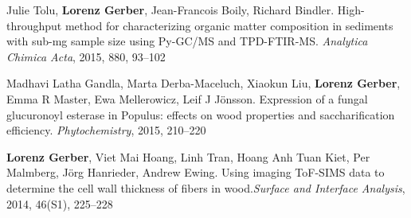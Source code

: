 \documentclass[10pt]{article}
\begin{document}
\begin{bibenum}
                                                                                           \item Julie Tolu, \textbf{Lorenz Gerber}, Jean-Francois Boily,
                                                                                             Richard Bindler. High-throughput method for characterizing
                                                                                             organic matter composition in sediments with sub-mg sample
                                                                                             size using Py-GC/MS and TPD-FTIR-MS. \textit{Analytica Chimica
                                                                                               Acta}, 2015, 880, 93--102\\


                                                                                           \item Madhavi Latha Gandla, Marta Derba-Maceluch, Xiaokun
                                                                                             Liu, \textbf{Lorenz Gerber}, Emma R Master, Ewa Mellerowicz, Leif J
                                                                                             J\"{o}nsson. Expression of a fungal glucuronoyl esterase in Populus:
                                                                                             effects on wood properties and saccharification efficiency.
                                                                                             \textit{Phytochemistry}, 2015, 210--220\\


                                                                                           \item \textbf{Lorenz Gerber}, Viet Mai Hoang, Linh Tran,
                                                                                             Hoang Anh Tuan Kiet, Per Malmberg, J\"{o}rg Hanrieder, Andrew Ewing.
                                                                                             Using imaging ToF-SIMS data to determine the cell wall thickness of
                                                                                             fibers in wood.\textit{Surface and Interface Analysis}, 2014,
                                                                                             46(S1), 225--228\\



\end{bibenum}
\end{document}
